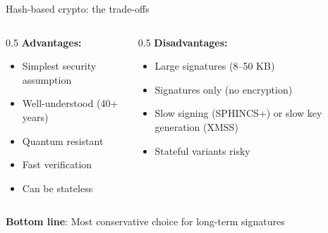 \ifdefined\PRESENTATION\else\PassOptionsToClass{handout}{beamer}\fi\documentclass[aspectratio=169, lualatex]{beamer}
\begin{document}
\begin{frame}{Hash-based crypto: the trade-offs}
	\begin{columns}[c]
		\begin{column}{0.5\textwidth}
			\textbf{Advantages:}
			\begin{itemize}
				\item[\mycheckmark] Simplest security assumption
				\item[\mycheckmark] Well-understood (40+ years)
				\item[\mycheckmark] Quantum resistant
				\item[\mycheckmark] Fast verification
				\item[\mycheckmark] Can be stateless
			\end{itemize}
		\end{column}
		\begin{column}{0.5\textwidth}
			\textbf{Disadvantages:}
			\begin{itemize}
				\item[$\times$] Large signatures (8--50 KB)
				\item[$\times$] Signatures only (no encryption)
				\item[$\times$] Slow signing (SPHINCS+) or slow key generation (XMSS)
				\item[$\times$] Stateful variants risky
			\end{itemize}
		\end{column}
	\end{columns}
	\vspace{5mm}
	\begin{center}
		\textbf{Bottom line}: Most conservative choice for long-term signatures
	\end{center}
\end{frame}
\end{document}
